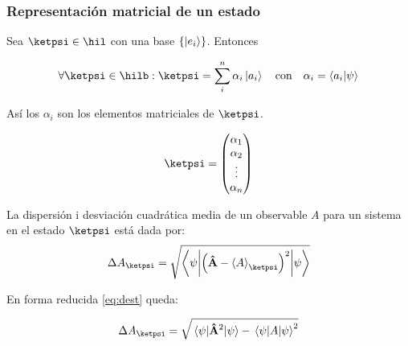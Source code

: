 \subsubsection{Representación matricial de un estado \ketpsi}
Sea $\ketpsi\in\hil$ con una base $\qty{\ket{e_i}}$. Entonces

$$
    \forall\ketpsi\in\hilb:\ketpsi=\sum_i^n\alpha_i\ket{a_i}\qq{con}\alpha_i=\braket{a_i}{\psi}
$$

Así los $\alpha_i$ son los elementos matriciales de $\ketpsi$.

$$
    \ketpsi=\mqty(\alpha_1\\\alpha_2\\\vdots\\\alpha_n)
$$

\begin{definition}
    La dispersión i desviación cuadrática media de un observable $A$ para un sistema en el estado $\ketpsi$ está dada por:
        \begin{equation}
            \Delta A_{\ketpsi}=\sqrt{
            \expval**{ \qty(\vu{A}-\expval{A}_{\ketpsi})^2}{\psi}
            }
            \label{eq:dest}
        \end{equation}
\end{definition}

En forma reducida \autoref{eq:dest} queda:

\begin{equation}
            \Delta A_{\ketpsi}=\sqrt{\expval{\vu{A}^2}{\psi}-\expval{A}{\psi}^2}
            \label{eq:dest2}
        \end{equation}